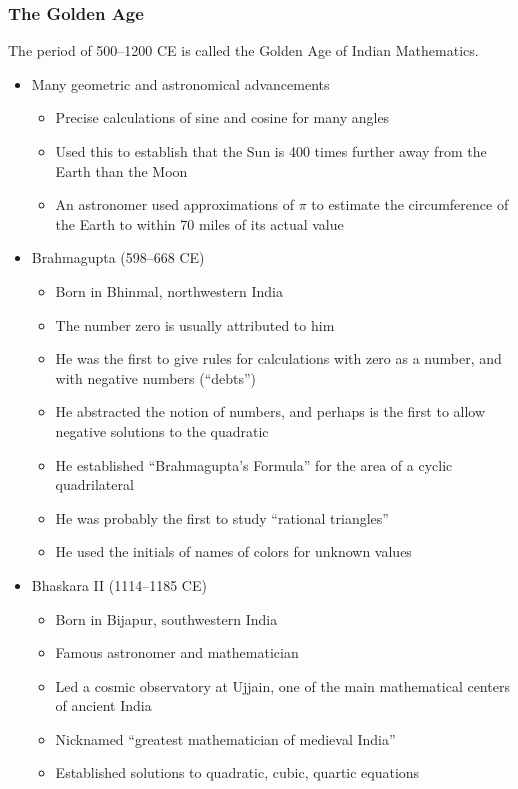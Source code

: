 \documentclass[class=article, crop=false]{standalone}
\begin{document}
  \subsubsection{The Golden Age}
  The period of 500--1200 CE is called the Golden Age of Indian Mathematics.
  \begin{itemize}
    \item Many geometric and astronomical advancements
    \begin{itemize}
      \item Precise calculations of sine and cosine for many angles
      \item Used this to establish that the Sun is 400 times further away from the Earth than the Moon
      \item An astronomer used approximations of $\pi$ to estimate the circumference of the Earth to within 70 miles of its actual value
    \end{itemize}
    \item Brahmagupta  (598--668 CE)
    \begin{itemize}
      \item Born in Bhinmal, northwestern India
      \item The number zero is usually attributed to him
      \item He was the first to give rules for calculations with zero as a number, and with negative numbers (``debts'')
      \item He abstracted the notion of numbers, and perhaps is the first to allow negative solutions to the quadratic
      \item He established ``Brahmagupta's Formula'' for the area of a cyclic quadrilateral
      \item He was probably the first to study ``rational triangles''
      \item He used the initials of names of colors for unknown values
    \end{itemize}
    \item Bhaskara II (1114--1185 CE)
    \begin{itemize}
      \item Born in Bijapur, southwestern India
      \item Famous astronomer and mathematician
      \item Led a cosmic observatory at Ujjain, one of the main mathematical centers of ancient India
      \item Nicknamed ``greatest mathematician of medieval India''
      \item Established solutions to quadratic, cubic, quartic equations

\end{itemize}
\end{itemize}
\end{document}
